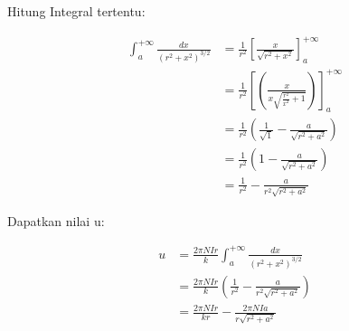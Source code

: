 \documentclass[12pt, letterpaper]{article}
\begin{document}
\begin{enumerate}
    Hitung Integral tertentu:

    \begin{align*}
    \int_{a}^{+\infty} \frac{dx}{(r^2 + x^2)^{3/2}}
    &= \frac{1}{r^2} \left[ \frac{x}{\sqrt{r^2 + x^2}} \right]_{a}^{+\infty}\\
    &= \frac{1}{r^2} \left[ \left( \frac{x}{x \sqrt{\frac{r^2}{x^2}+1}} \right) \right]_{a}^{+\infty} \\
    &= \frac{1}{r^2}  \left( \frac{1}{\sqrt{1}} - \frac{a}{\sqrt{r^2 + a^2}} \right) \\
    &= \frac{1}{r^2}  \left( 1 - \frac{a}{\sqrt{r^2 + a^2}} \right) \\
    &= \frac{1}{r^2} - \frac{a}{r^2 \sqrt{r^2 + a^2}}
    \end{align*}

    Dapatkan nilai u:

    \begin{align*}
    u &= \frac{2 \pi NIr}{k} \int_{a}^{+\infty} \frac{dx}{(r^2 + x^2)^{3/2}} \\
    &= \frac{2 \pi NIr}{k} \left( \frac{1}{r^2} - \frac{a}{r^2 \sqrt{r^2 + a^2}} \right) \\
    &= \frac{2 \pi NIr}{kr} - \frac{2 \pi N I a}{r \sqrt{r^2 + a^2}}
    \end{align*}
    
\end{enumerate}

\newpage
\end{document}
